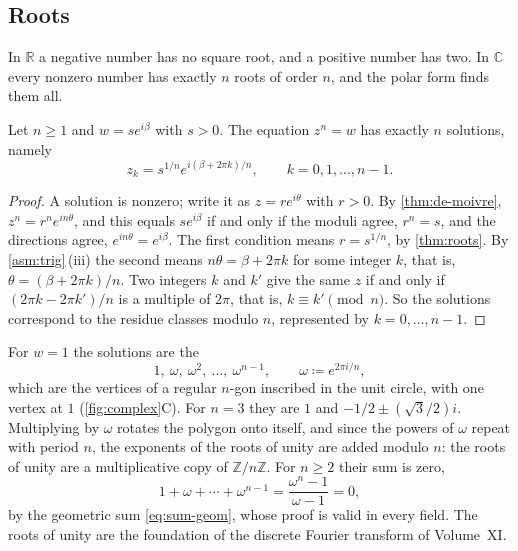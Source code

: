 \subsection{Roots}

In $\mathbb R$ a negative number has no square root, and a positive number has two. In $\mathbb C$ every nonzero number has exactly $n$ roots of order $n$, and the polar form finds them all.

\begin{theorem}
\label{thm:complex-roots}
Let $n\ge1$ and $w=se^{i\beta}$ with $s>0$. The equation $z^n=w$ has exactly $n$ solutions, namely
\[
z_k=s^{1/n}e^{i(\beta+2\pi k)/n},\qquad k=0,1,\ldots,n-1 .
\]
\end{theorem}

\begin{proof}
A solution is nonzero; write it as $z=re^{i\theta}$ with $r>0$. By \cref{thm:de-moivre}, $z^n=r^ne^{in\theta}$, and this equals $se^{i\beta}$ if and only if the moduli agree, $r^n=s$, and the directions agree, $e^{in\theta}=e^{i\beta}$. The first condition means $r=s^{1/n}$, by \cref{thm:roots}. By \cref{asm:trig}\,(iii) the second means $n\theta=\beta+2\pi k$ for some integer $k$, that is, $\theta=(\beta+2\pi k)/n$. Two integers $k$ and $k'$ give the same $z$ if and only if $(2\pi k-2\pi k')/n$ is a multiple of $2\pi$, that is, $k\equiv k'\pmod n$. So the solutions correspond to the residue classes modulo $n$, represented by $k=0,\ldots,n-1$.
\end{proof}

For $w=1$ the solutions are the 
\[
1,\ \omega,\ \omega^2,\ \ldots,\ \omega^{n-1},\qquad\omega\coloneqq e^{2\pi i/n},
\]
which are the vertices of a regular $n$-gon inscribed in the unit circle, with one vertex at $1$ (\cref{fig:complex}C). For $n=3$ they are $1$ and $-1/2\pm(\sqrt3/2)i$. Multiplying by $\omega$ rotates the polygon onto itself, and since the powers of $\omega$ repeat with period $n$, the exponents of the roots of unity are added modulo $n$: the roots of unity are a multiplicative copy of $\mathbb Z/n\mathbb Z$. For $n\ge2$ their sum is zero,
\[
1+\omega+\cdots+\omega^{n-1}=\frac{\omega^n-1}{\omega-1}=0 ,
\]
by the geometric sum \eqref{eq:sum-geom}, whose proof is valid in every field. The roots of unity are the foundation of the discrete Fourier transform of Volume~XI.

